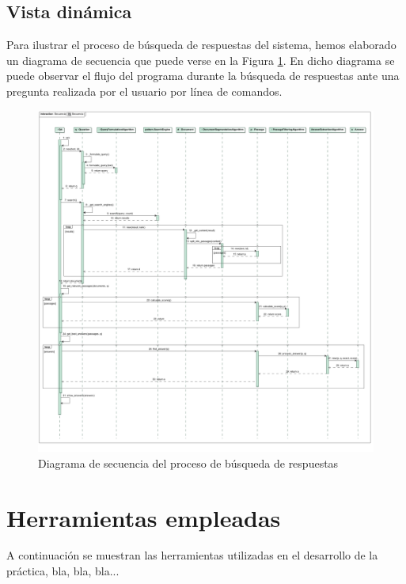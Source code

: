 \documentclass[12pt,a4paper,titlepage]{article}
\begin{document}
\subsection{Vista dinámica}
Para ilustrar el proceso de búsqueda de respuestas del sistema, hemos elaborado un diagrama de secuencia que puede verse en la Figura \ref{fig:secuencia}. En dicho diagrama se puede observar el flujo del programa durante la búsqueda de respuestas ante una pregunta realizada por el usuario por línea de comandos.

\begin{figure}[h!]
\begin{center}
\includegraphics[width=\textwidth]{res/secuencia}
\end{center}
\caption{Diagrama de secuencia del proceso de búsqueda de respuestas}
\label{fig:secuencia}
\end{figure}

\clearpage
\section{Herramientas empleadas}
A continuación se muestran las herramientas utilizadas en el desarrollo de la práctica, bla, bla, bla...
\end{document}
